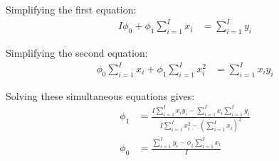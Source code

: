 \documentclass[10pt]{article}
\begin{document}
Simplifying the first equation:
\begin{align*}
I\phi_0 + \phi_1\sum_{i=1}^{I} x_i &= \sum_{i=1}^{I} y_i \tag{1}
\end{align*}

Simplifying the second equation:
\begin{align*}
\phi_0\sum_{i=1}^{I} x_i + \phi_1\sum_{i=1}^{I} x_i^2 &= \sum_{i=1}^{I} x_iy_i \tag{2}
\end{align*}

Solving these simultaneous equations gives:
\begin{align*}
\phi_1 &= \frac{I\sum_{i=1}^{I} x_iy_i - \sum_{i=1}^{I} x_i\sum_{i=1}^{I} y_i}{I\sum_{i=1}^{I} x_i^2 - (\sum_{i=1}^{I} x_i)^2} \\[1em]
\phi_0 &= \frac{\sum_{i=1}^{I} y_i - \phi_1\sum_{i=1}^{I} x_i}{I}
\end{align*}
\end{document}

